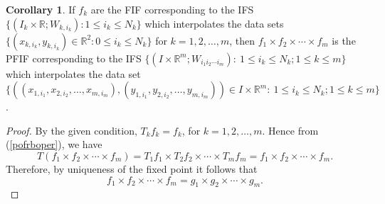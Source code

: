 \documentclass[10pt]{amsart}
\theoremstyle{definition}
\newtheorem{cor}{Corollary}[section]
\newcommand{\myseries}[3]{#1\leq #2\leq #3}
\newcommand{\profunc}[1]{#1_1\times#1_2\times\cdots\times#1_m}
\newcommand{\prodifs}[1]{#1_{i_1i_2\cdots i_m}}
\newcommand{\prodpoint}[2]{#1_{1,#2_1},#1_{2,#2_2},\ldots,#1_{m,#2_m}}
\begin{document}
	\begin{cor}
		If $f_k$ are the FIF corresponding to the IFS $\{(I_k\times\mathbb{R};W_{k,i_k}):\myseries{1}{i_k}{N_k}\}$ which interpolates the data sets $\{(x_{k,i_k},y_{k,i_k})\in\mathbb{R}^2:\myseries{0}{i_k}{N_k}\}$ for $k=1,2,\ldots,m$, then $\profunc{f}$ is the PFIF corresponding to the IFS $\{(I\times\mathbb{R}^m;\prodifs{W}):~\myseries{1}{i_k}{N_k};\myseries{1}{k}{m}\}$ which interpolates the data set $\{((\prodpoint{x}{i}),(\prodpoint{y}{i}))\in I\times\mathbb{R}^m:~\myseries{1}{i_k}{N_k};\myseries{1}{k}{m}\}$. \label{proditerfs}
	\end{cor}
	\begin{proof}
		By the given condition, $T_kf_k=f_k$, for $k=1,2,\ldots,m$. Hence from (\ref{pofrboper}), we have 
		$$T(\profunc{f})=T_1f_1\times T_2f_2\times\cdots\times T_mf_m=\profunc{f}.$$ 
		Therefore, by uniqueness of the fixed point it follows that
		$$\profunc{f}=\profunc{g}.$$
	\end{proof}
	
	
	
	
	
	
	
	
	
\end{document}
